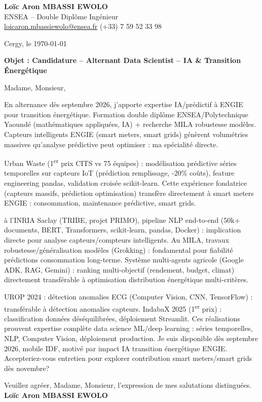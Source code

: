\documentclass[a4paper,11pt]{article}
\begin{document}
\noindent \textbf{Lo\"ic Aron MBASSI EWOLO} \\
ENSEA -- Double Dipl\^ome Ing\'enieur \\
\href{mailto:loicaron.mbassiewolo@ensea.fr}{loicaron.mbassiewolo@ensea.fr} \quad (+33) 7 59 52 33 98

\vspace{1em}
\noindent Cergy, le \today

\vspace{1em}
\noindent \textbf{Objet : Candidature -- Alternant Data Scientist -- IA \& Transition \'Energ\'etique}

\vspace{1.5em}
\noindent Madame, Monsieur,

\vspace{0.8em}
\noindent En alternance d\`es septembre 2026, j'apporte expertise IA/pr\'edictif \`a ENGIE pour transition \'energ\'etique. Formation double dipl\^ome ENSEA/Polytechnique Yaound\'e (math\'ematiques appliqu\'ees, IA) + recherche MILA robustesse mod\`eles. Capteurs intelligents ENGIE (smart meters, smart grids) g\'en\`erent volumétries massives qu'analyse pr\'edictive peut optimiser : ma sp\'ecialité directe.

\vspace{0.8em}
\noindent Urban Waste (1\textsuperscript{er} prix CITS vs 75 \'equipes) : mod\'elisation pr\'edictive s\'eries temporelles sur capteurs IoT (pr\'ediction remplissage, -20\% co\^uts), feature engineering pandas, validation crois\'ee scikit-learn. Cette exp\'erience fondatrice (capteurs massifs, pr\'ediction optimisation) transfère directement \`a smart meters ENGIE : consommation, maintenance pr\'edictive, smart grids.

\vspace{0.8em}
\noindent \`a l'INRIA Saclay (TRIBE, projet PRIMO), pipeline NLP end-to-end (50k+ documents, BERT, Transformers, scikit-learn, pandas, Docker) : implication directe pour analyse capteurs/compteurs intelligents. Au MILA, travaux robustesse/g\'en\'eralisation mod\`eles (Grokking) : fondamental pour fiabilit\'e pr\'edictions consommation long-terme. Syst\`eme multi-agents agricole (Google ADK, RAG, Gemini) : ranking multi-objectif (rendement, budget, climat) directement transf\'erable \`a optimisation distribution \'energétique multi-crit\`eres.

\vspace{0.8em}
\noindent UROP 2024 : d\'etection anomalies ECG (Computer Vision, CNN, TensorFlow) : transf\'erable \`a d\'etection anomalies capteurs. IndabaX 2025 (1\textsuperscript{er} prix) : classification donn\'ees d\'es\'equilibr\'ees, d\'eploiement Streamlit. Ces r\'ealisations prouvent expertise complète data science ML/deep learning : s\'eries temporelles, NLP, Computer Vision, d\'eploiement production. Je suis disponible d\`es septembre 2026, mobile IDF, motiv\'e par impact IA transition \'energ\'etique ENGIE. Accepteriez-vous entretien pour explorer contribution smart meters/smart grids d\`es novembre?

\vspace{1.5em}
\noindent Veuillez agr\'eer, Madame, Monsieur, l'expression de mes salutations distingu\'ees.
\vspace{2em}
\noindent \textbf{Lo\"ic Aron MBASSI EWOLO}
\end{document}
